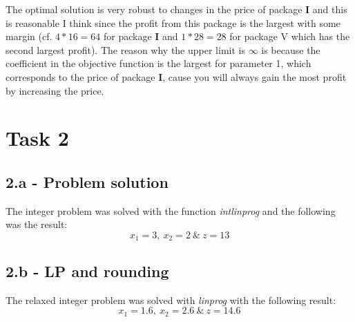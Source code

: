 \documentclass[]{article}
\begin{document}
The optimal solution is very robust to changes in the price of package \textbf{I} and this is reasonable I think since the profit from this package is the largest with some margin (cf. $4*16 = 64$ for package \textbf{I} and $1*28 = 28$ for package V which has the second largest profit).
The reason why the upper limit is $\infty$ is because the coefficient in the objective function is the largest for parameter 1, which corresponds to the price of package \textbf{I}, cause you will always gain the most profit by increasing the price.

\section*{Task 2}

\subsection*{2.a - Problem solution}
The integer problem was solved with the function \textit{intlinprog} and the following was the result:
\begin{equation}
  x_1 = 3, \ x_2 = 2 \ \& \ z = 13
  \label{eq:task2a}
\end{equation}

\subsection*{2.b - LP and rounding}
The relaxed integer problem was solved with \textit{linprog} with the following result:
\begin{equation}
  x_1 = 1.6, \ x_2 = 2.6 \ \& \ z = 14.6
  \label{eq:task2b}
\end{equation}
\end{document}
